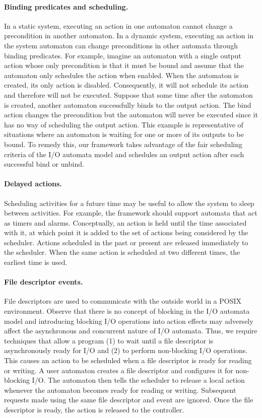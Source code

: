 \paragraph*{Binding predicates and scheduling.}
In a static system, executing an action in one automaton cannot change a precondition in another automaton.
In a dynamic system, executing an action in the system automaton can change preconditions in other automata through binding predicates.
For example, imagine an automaton with a single output action whose only precondition is that it must be bound and assume that the automaton only schedules the action when enabled.
When the automaton is created, its only action is disabled.
Consequently, it will not schedule its action and therefore will not be executed.
Suppose that some time after the automaton is created, another automaton successfully binds to the output action.
The bind action changes the precondition but the automaton will never be executed since it has no way of scheduling the output action.
This example is representative of situations where an automaton is waiting for one or more of its outputs to be bound.
To remedy this, our framework takes advantage of the fair scheduling criteria of the I/O automata model and schedules an output action after each successful bind or unbind.

\paragraph*{Delayed actions.}
Scheduling activities for a future time may be useful to allow the system to sleep between activities.
For example, the framework should support automata that act as timers and alarms.
Conceptually, an action is held until the time associated with it, at which point it is added to the set of actions being considered by the scheduler.
Actions scheduled in the past or present are released immediately to the scheduler.
When the same action is scheduled at two different times, the earliest time is used.

\paragraph*{File descriptor events.}
File descriptors are used to communicate with the outside world in a POSIX environment.
Observe that there is no concept of blocking in the I/O automata model and introducing blocking I/O operations into action effects may adversely affect the asynchronous and concurrent nature of I/O automata.
Thus, we require techniques that allow a program (1) to wait until a file descriptor is asynchronously ready for I/O and (2) to perform non-blocking I/O operations.
This causes an action to be scheduled when a file descriptor is ready for reading or writing.
A user automaton creates a file descriptor and configures it for non-blocking I/O.
The automaton then tells the scheduler to release a local action whenever the automaton becomes ready for reading or writing.
Subsequent requests made using the same file descriptor and event are ignored.
Once the file descriptor is ready, the action is released to the controller.

